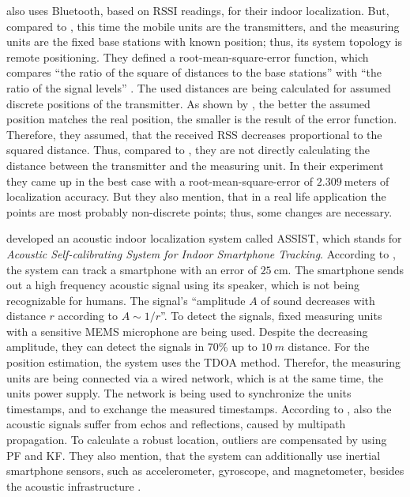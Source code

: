 \citet{oksar:bluetooth} also uses Bluetooth, based on \acs{RSSI} readings, for their indoor localization. But, compared to \citet{wang:bt_pos}, this time the mobile units are the transmitters, and the measuring units are the fixed base stations with known position; thus, its system topology is remote positioning. They defined a root-mean-square-error function, which compares ``the ratio of the square of distances to the base stations'' with ``the ratio of the signal levels'' \citep{oksar:bluetooth}. The used distances are being calculated for assumed discrete positions of the transmitter. As shown by \citet{oksar:bluetooth}, the better the assumed position matches the real position, the smaller is the result of the error function. Therefore, they assumed, that the received \acs{RSS} decreases proportional to the squared distance. Thus, compared to \citet{wang:bt_pos}, they are not directly calculating the distance between the transmitter and the measuring unit. In their experiment they came up in the best case with a root-mean-square-error of $2.309~\text{meters}$ of localization accuracy. But they also mention, that in a real life application the points are most probably non-discrete points; thus, some changes are necessary.

\citet{hoflinger:acoustic} developed an acoustic indoor localization system called ASSIST, which stands for \emph{Acoustic Self-calibrating System for Indoor Smartphone Tracking}. According to \citet{hoflinger:acoustic}, the system can track a smartphone with an error of $25~\text{cm}$. The smartphone sends out a high frequency acoustic signal using its speaker, which is not being recognizable for humans. The signal's ``amplitude $A$ of sound decreases with distance $r$ according to $A \sim 1/r$''. To detect the signals, fixed measuring units with a sensitive \acs{MEMS} microphone are being used. Despite the decreasing amplitude, they can detect the signals in 70\% up to $10~m$ distance. For the position estimation, the system uses the \acs{TDOA} method. Therefor, the measuring units are being connected via a wired network, which is at the same time, the units power supply. The network is being used to synchronize the units timestamps, and to exchange the measured timestamps. According to \citet{hoflinger:acoustic}, also the acoustic signals suffer from echos and reflections, caused by multipath propagation. To calculate a robust location, outliers are compensated by using \acs{PF} and \acs{KF}. They also mention, that the system can additionally use inertial smartphone sensors, such as accelerometer, gyroscope, and magnetometer, besides the acoustic infrastructure \citep{hoflinger:acoustic, hoflinger:assist}.

